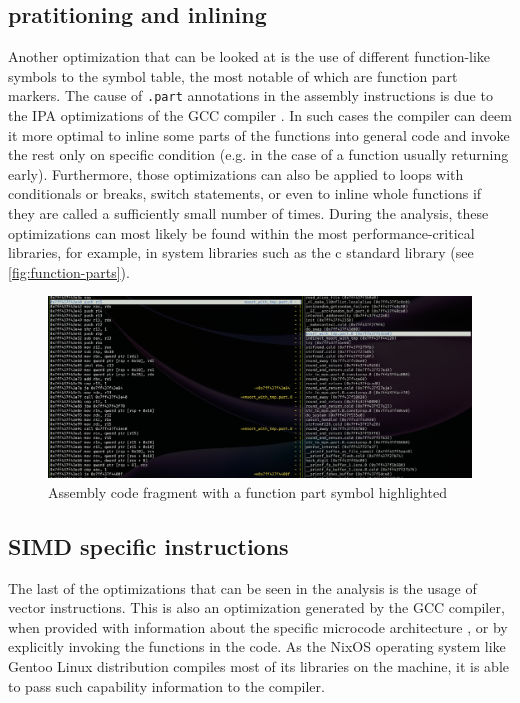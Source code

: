 \subsection{pratitioning and inlining}

Another optimization that can be looked at is the use of different function-like symbols to the symbol table, the most notable of which are function part markers.
The cause of \verb|.part| annotations in the assembly instructions is due to the IPA optimizations of the GCC compiler \cite{noauthor_ipa_nodate}.
In such cases the compiler can deem it more optimal to inline some parts of the functions into general code and invoke the rest only on specific condition (e.g. in the case of a function usually returning early).
Furthermore, those optimizations can also be applied to loops with conditionals or breaks, switch statements, or even to inline whole functions if they are called a sufficiently small number of times.
During the analysis, these optimizations can most likely be found within the most performance-critical libraries, for example, in system libraries such as the c standard library (see \autoref{fig:function-parts}).

\begin{figure}
    \centering
    \includegraphics[width=1\linewidth]{function-parts.png}
    \caption{Assembly code fragment with a function part symbol highlighted}
    \label{fig:function-parts}
\end{figure}

\subsection{SIMD specific instructions}

The last of the optimizations that can be seen in the analysis is the usage of vector instructions.
This is also an optimization generated by the GCC compiler, when provided with information about the specific microcode architecture \cite{noauthor_x86_nodate}, or by explicitly invoking the functions in the code.
As the NixOS operating system like Gentoo Linux distribution compiles most of its libraries on the machine, it is able to pass such capability information to the compiler.

